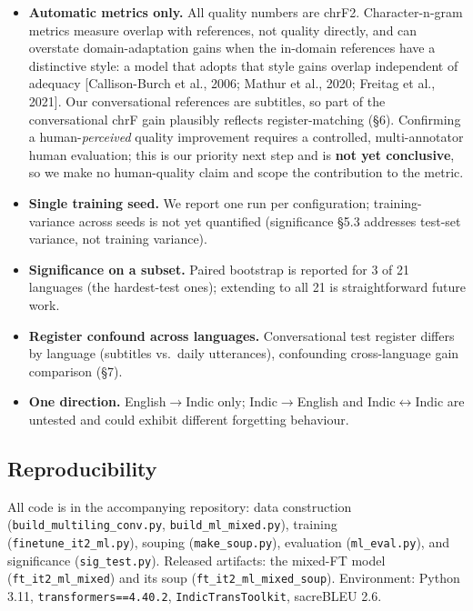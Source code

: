 \documentclass[
  11pt,
]{article}
\providecommand{\tightlist}{%
  \setlength{\itemsep}{0pt}\setlength{\parskip}{0pt}}
\begin{document}
\begin{itemize}
\tightlist
\item
  \textbf{Automatic metrics only.} All quality numbers are chrF2.
  Character-n-gram metrics measure overlap with references, not quality
  directly, and can overstate domain-adaptation gains when the in-domain
  references have a distinctive style: a model that adopts that style
  gains overlap independent of adequacy {[}Callison-Burch et al., 2006;
  Mathur et al., 2020; Freitag et al., 2021{]}. Our conversational
  references are subtitles, so part of the conversational chrF gain
  plausibly reflects register-matching (§6). Confirming a
  human-\emph{perceived} quality improvement requires a controlled,
  multi-annotator human evaluation; this is our priority next step and
  is \textbf{not yet conclusive}, so we make no human-quality claim and
  scope the contribution to the metric.
\item
  \textbf{Single training seed.} We report one run per configuration;
  training-variance across seeds is not yet quantified (significance
  §5.3 addresses test-set variance, not training variance).
\item
  \textbf{Significance on a subset.} Paired bootstrap is reported for 3
  of 21 languages (the hardest-test ones); extending to all 21 is
  straightforward future work.
\item
  \textbf{Register confound across languages.} Conversational test
  register differs by language (subtitles vs.~daily utterances),
  confounding cross-language gain comparison (§7).
\item
  \textbf{One direction.} English$\to$Indic only; Indic$\to$English and
  Indic$\leftrightarrow$Indic are untested and could exhibit different forgetting
  behaviour.
\end{itemize}

\hypertarget{reproducibility}{%
\subsection{Reproducibility}\label{reproducibility}}

All code is in the accompanying repository: data construction
(\texttt{build\_multiling\_conv.py}, \texttt{build\_ml\_mixed.py}),
training (\texttt{finetune\_it2\_ml.py}), souping
(\texttt{make\_soup.py}), evaluation (\texttt{ml\_eval.py}), and
significance (\texttt{sig\_test.py}). Released artifacts: the mixed-FT
model (\texttt{ft\_it2\_ml\_mixed}) and its soup
(\texttt{ft\_it2\_ml\_mixed\_soup}). Environment: Python 3.11,
\texttt{transformers==4.40.2}, \texttt{IndicTransToolkit}, sacreBLEU
2.6.
\end{document}
